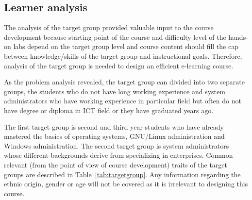 \subsection{Learner analysis}


The analysis of the target group provided valuable input to the course development because starting point of the course and difficulty level of the hands-on labs depend on the target group level and course content should fill the cap between knowledge/skills of the target group and instructional goals. Therefore, analysis of the target group is needed to design an efficient e-learning course.

As the problem analysis revealed,  the target group can divided into two separate groups, the students who do not have long working experience and system administrators who have working experience in particular field but often do not have degree or diploma in \gls{ICT} field or they have graduated years ago.

The first target group is second and third year students who have already mastered the basics of operating systems, GNU/Linux administration and Windows administration. The second target group is system administrators whose different backgrounds derive from specializing in enterprises. Common relevant (from the point of view of course development) traits of the target groups are described in Table~\ref{tab:targetgroup}. Any information regarding the ethnic origin, gender or age will not be covered as it is irrelevant to designing this course.


